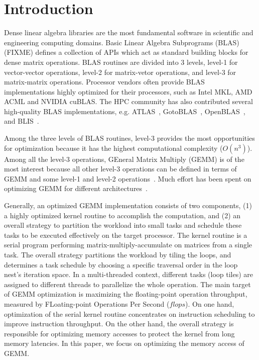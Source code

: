 \section{Introduction}\label{sec:intro}
Dense linear algebra libraries are the most fundamental software in
scientific and engineering computing domains.
Basic Linear Algebra Subprograms (BLAS) (FIXME) defines a collection
of APIs which act as standard building blocks for dense matrix operations.
BLAS routines are divided into 3 levels,
level-1 for vector-vector operations,
level-2 for matrix-vetor operations,
and level-3 for matrix-matrix operations.
Processor vendors often provide BLAS implementations
highly optimized for their processors,
such as Intel MKL, AMD ACML and NVIDIA cuBLAS.
The HPC community has also contributed several high-quality
BLAS implementations, e.g. ATLAS~\cite{atlas},
GotoBLAS~\cite{gotoblas}, OpenBLAS~\cite{openblas},
and BLIS~\cite{blis,blisport}.

Among the three levels of BLAS routines, level-3 provides the most opportunities
for optimization because it has the highest computational complexity ($O(n^3)$).
Among all the level-3 operations, GEneral Matrix Multiply (GEMM) is
of the most interest because all other level-3 operations can be defined
in terms of GEMM and some level-1 and level-2 operations~\cite{gemmbased1}.
Much effort has been spent on optimizing GEMM for different
architectures~\cite{Liu2012,Wang2015,Volkov:2008,Cui11,blispar}.

Generally, an optimized GEMM implementation consists of two components,
(1) a highly optimized kernel routine to accomplish the computation, and
(2) an overall strategy to partition the workload into small tasks
and schedule these tasks to be executed effectively on the target processor.
The kernel routine is a serial program performing matrix-multiply-accumulate
on matrices from a single task.
The overall strategy partitions the workload by tiling the loops,
and determines a task schedule by choosing a specific traversal order
in the loop nest's iteration space.
In a multi-threaded context, different tasks (loop tiles) are assigned to
different threads to parallelize the whole operation.
The main target of GEMM optimization is maximizing the floating-point
operation throughput, measured by FLoating-point Operations Per Second ($flops$).
On one hand, optimization of the serial kernel routine concentrates on
instruction scheduling to improve instruction throughput.
On the other hand, the overall strategy is responsible for optimizing
memory accesses to protect the kernel from long memory latencies.
In this paper, we focus on optimizing the memory access of GEMM.

